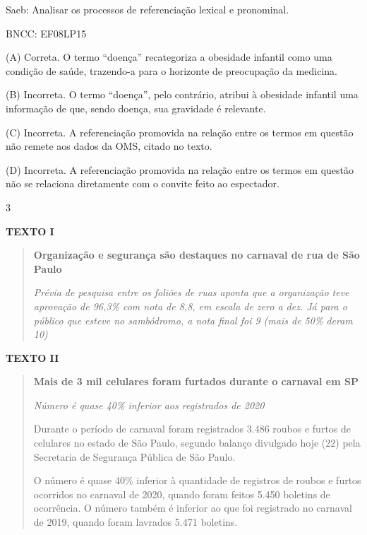 Saeb: Analisar os processos de referenciação lexical e pronominal.

BNCC: EF08LP15

(A) Correta. O termo ``doença'' recategoriza a obesidade infantil como
uma condição de saúde, trazendo-a para o horizonte de preocupação da
medicina.

(B) Incorreta. O termo ``doença'', pelo contrário, atribui à obesidade
infantil uma informação de que, sendo doença, sua gravidade é relevante.

(C) Incorreta. A referenciação promovida na relação entre os termos em
questão não remete aos dados da OMS, citado no texto.

(D) Incorreta. A referenciação promovida na relação entre os termos em
questão não se relaciona diretamente com o convite feito ao espectador.

\num{3}

\textbf{TEXTO I}

\begin{quote}
\textbf{Organização e segurança são destaques no carnaval de rua de São
Paulo}

\emph{Prévia de pesquisa entre os foliões de ruas aponta que a
organização teve aprovação de 96,3\% com nota de 8,8, em escala de zero
a dez. Já para o público que esteve no sambódromo, a nota final foi 9
(mais de 50\% deram 10)}
\end{quote}


\textbf{TEXTO II}

\begin{quote}
\textbf{Mais de 3 mil celulares foram furtados durante o carnaval em SP}

\emph{Número é quase 40\% inferior aos registrados de 2020}

Durante o período de carnaval foram registrados 3.486 roubos e furtos de
celulares no estado de São Paulo, segundo balanço divulgado hoje (22)
pela Secretaria de Segurança Pública de São Paulo.

O número é quase 40\% inferior à quantidade de registros de roubos e
furtos ocorridos no carnaval de 2020, quando foram feitos 5.450 boletins
de ocorrência. O número também é inferior ao que foi registrado no
carnaval de 2019, quando foram lavrados 5.471 boletins.
\end{quote}

